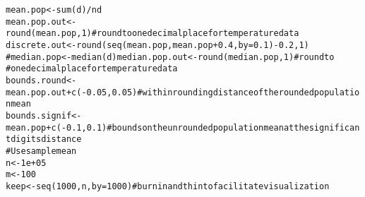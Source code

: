 \documentclass{article}\usepackage[]{graphicx}\usepackage[]{color}
\makeatletter
\newcommand{\hlnum}[1]{\textcolor[rgb]{0.863,0.196,0.184}{#1}}%
\newcommand{\hlcom}[1]{\textcolor[rgb]{0.345,0.431,0.459}{#1}}%
\newcommand{\hlopt}[1]{\textcolor[rgb]{0.576,0.631,0.631}{#1}}%
\newcommand{\hlstd}[1]{\textcolor[rgb]{0.514,0.58,0.588}{#1}}%
\newcommand{\hlkwb}[1]{\textcolor[rgb]{0.522,0.6,0}{#1}}%
\newcommand{\hlkwc}[1]{\textcolor[rgb]{0.796,0.294,0.086}{#1}}%
\newcommand{\hlkwd}[1]{\textcolor[rgb]{0.576,0.631,0.631}{#1}}%
\newenvironment{kframe}{%
 \def\at@end@of@kframe{}%
 \ifinner\ifhmode%
  \def\at@end@of@kframe{\end{minipage}}%
  \begin{minipage}{\columnwidth}%
 \fi\fi%
 \def\FrameCommand##1{\hskip\@totalleftmargin \hskip-\fboxsep
 \colorbox{shadecolor}{##1}\hskip-\fboxsep
     \hskip-\linewidth \hskip-\@totalleftmargin \hskip\columnwidth}%
 \MakeFramed {\advance\hsize-\width
   \@totalleftmargin\z@ \linewidth\hsize
   \@setminipage}}%
 {\par\unskip\endMakeFramed%
 \at@end@of@kframe}
\newenvironment{knitrout}{}{} %
\makeatother
\begin{document}
\begin{knitrout}
\color{fgcolor}\begin{kframe}
\begin{alltt}
\hlstd{mean.pop} \hlkwb{<-} \hlkwd{sum}\hlstd{(d)}\hlopt{/}\hlstd{nd}
\hlstd{mean.pop.out} \hlkwb{<-} \hlkwd{round}\hlstd{(mean.pop,} \hlnum{1}\hlstd{)}  \hlcom{# round to one decimal place for temperature data}
\hlstd{discrete.out} \hlkwb{<-} \hlkwd{round}\hlstd{(}\hlkwd{seq}\hlstd{(mean.pop, mean.pop} \hlopt{+} \hlnum{0.4}\hlstd{,} \hlkwc{by} \hlstd{=} \hlnum{0.1}\hlstd{)} \hlopt{-} \hlnum{0.2}\hlstd{,} \hlnum{1}\hlstd{)}
\hlcom{# median.pop <- median(d) median.pop.out <- round(median.pop, 1) # round to}
\hlcom{# one decimal place for temperature data}
\hlstd{bounds.round} \hlkwb{<-} \hlstd{mean.pop.out} \hlopt{+} \hlkwd{c}\hlstd{(}\hlopt{-}\hlnum{0.05}\hlstd{,} \hlnum{0.05}\hlstd{)}  \hlcom{# within rounding distance of the rounded population mean}
\hlstd{bounds.signif} \hlkwb{<-} \hlstd{mean.pop} \hlopt{+} \hlkwd{c}\hlstd{(}\hlopt{-}\hlnum{0.1}\hlstd{,} \hlnum{0.1}\hlstd{)}  \hlcom{# bounds on the unrounded population mean at the significant digits distance}
\hlcom{# Use sample mean}
\hlstd{n} \hlkwb{<-} \hlnum{1e+05}
\hlstd{m} \hlkwb{<-} \hlnum{100}
\hlstd{keep} \hlkwb{<-} \hlkwd{seq}\hlstd{(}\hlnum{1000}\hlstd{, n,} \hlkwc{by} \hlstd{=} \hlnum{1000}\hlstd{)}  \hlcom{# burn in and thin to facilitate visualization}


\end{alltt}
\end{kframe}
\end{knitrout}
\end{document}
